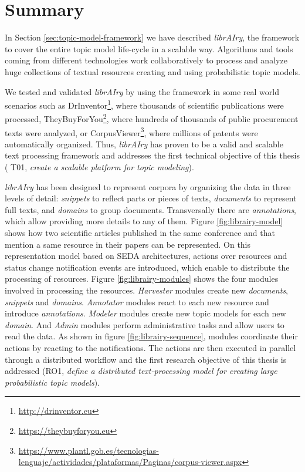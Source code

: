 \section{Summary}

In Section \ref{sec:topic-model-framework} we have described \textit{librAIry}, the framework to cover the entire topic model life-cycle in a scalable way. Algorithms and tools coming from different technologies work collaboratively to process and analyze huge collections of textual resources creating and using probabilistic topic models. 

We tested and validated \textit{librAIry} by using the framework in some real world scenarios such as DrInventor\footnote{\url{http://drinventor.eu}}, where thousands of scientific publications were processed, TheyBuyForYou\footnote{\url{https://theybuyforyou.eu}}, where hundreds of thousands of public procurement texts were analyzed, or 
CorpusViewer\footnote{\url{https://www.plantl.gob.es/tecnologias-lenguaje/actividades/plataformas/Paginas/corpus-viewer.aspx}}, where millions of patents were automatically organized. Thus, \textit{librAIry} has proven to be a valid and scalable text processing framework and addresses the first technical objective of this thesis ( T01, \textit{create a scalable platform for  topic modeling}).

\textit{librAIry} has been designed to represent corpora by organizing the data in three levels of detail: \textit{snippets} to reflect parts or pieces of texts, \textit{documents} to represent full texts, and \textit{domains} to group documents. Transversally there are \textit{annotations}, which allow providing more details to any of them. Figure \ref{fig:librairy-model} shows how two scientific articles published in the same conference and that mention a same resource in their papers can be represented. On this representation model based on SEDA architectures, actions over resources and status change notification events are introduced, which enable to distribute the processing of resources. Figure \ref{fig:librairy-modules} shows the four modules involved in processing the resources. \textit{Harvester} modules create new \textit{documents}, \textit{snippets} and \textit{domains}. \textit{Annotator} modules react to each new resource and introduce \textit{annotations}. \textit{Modeler} modules create new topic models for each new \textit{domain}. And \textit{Admin} modules perform administrative tasks and allow users to read the data. As shown in figure \ref{fig:librairy-sequence}, modules coordinate their actions by reacting to the notifications. The actions are then executed in parallel through a distributed workflow and the first research objective of this thesis is addressed (RO1, \textit{define a distributed text-processing model for creating large probabilistic topic models}).

